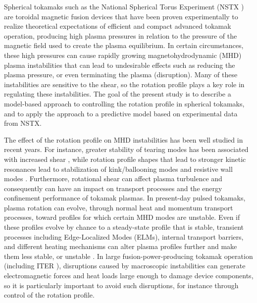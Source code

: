 \documentclass{iopart}
\begin{document}
Spherical tokamaks such as the National Spherical Torus Experiment (NSTX
\cite{Ono00}) are toroidal magnetic fusion devices that have been proven
experimentally to realize theoretical expectations of efficient and compact
advanced tokamak operation, producing high plasma pressures in relation to the
pressure of the magnetic field used to create the plasma equilibrium. In certain
circumstances, these high pressures can cause rapidly growing
magnetohydrodynamic (MHD) plasma instabilities that can lead to undesirable
effects such as reducing the plasma pressure, or even terminating the plasma (disruption).
%
Many of these instabilities are sensitive to the shear, so the rotation profile
plays a key role in regulating these instabilities.
%
The goal of the present study is to describe a model-based approach to
controlling the rotation profile in spherical tokamaks, and to apply the
approach to a predictive model based on experimental data from NSTX.

The effect of the rotation profile on MHD instabilities has been well studied in
recent years.  For instance, greater stability of tearing modes has been associated with
increased shear \cite{Gerhardt09, Park13}, while
rotation profile shapes that lead to stronger kinetic resonances lead to
stabilization of kink/ballooning modes and resistive wall modes \cite{Sabbagh10,
  Berkery10}. Furthermore, rotational shear can affect plasma turbulence and
consequently can have an impact on transport processes and the energy
confinement performance of tokamak plasmas. In present-day pulsed tokamaks,
plasma rotation can evolve, through normal heat and momentum transport
processes, toward profiles for which certain MHD modes are unstable.
%
Even if these profiles evolve by chance to a steady-state profile that is
stable, transient processes including Edge-Localized Modes (ELMs), internal transport
barriers, and different heating mechanisms can alter plasma profiles further and make
them less stable, or unstable \cite{Sabbagh13}.
%
In large fusion-power-producing tokamak operation (including ITER
\cite{Hender07}), disruptions caused by macroscopic instabilities can generate
electromagnetic forces and heat loads large enough to damage device components,
so it is particularly important to avoid such disruptions, for instance through
control of the rotation profile.
\end{document}
